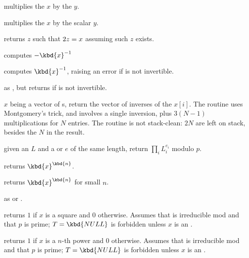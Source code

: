 
 multiplies the  $x$
by the  $y$.

 multiplies the  $x$
by the scalar $y$.

 returns $z$ such that $2\*z = x$
assuming such $z$ exists.



 computes $-\kbd{x}^{-1}$

 computes $\kbd{x}^{-1}$, raising an
error if  is not invertible.

 as , but returns
 if  is not invertible.


 $x$ being a vector of s,
return the vector of inverses of the $x[i]$. The routine uses Montgomery's
trick, and involves a single inversion, plus $3(N-1)$ multiplications for
$N$ entries. The routine is not stack-clean: $2N$  are left on
stack, besides the $N$ in the result.

 given an  $L$
and a  or  $e$ of the same length, return $\prod_i L_i^{e_i}$
modulo $p$.

 returns $\kbd{x}^\kbd{n}$.

 returns $\kbd{x}^\kbd{n}$
for small $n$.

 as
 or .

 returns $1$ if $x$ is a square
and $0$ otherwise. Assumes that  is irreducible mod  and that
$p$ is prime; $T = \kbd{NULL}$ is forbidden unless $x$ is an .

 returns $1$ if $x$
is a $n$-th power and $0$ otherwise. Assumes that  is irreducible mod
 and that $p$ is prime; $T = \kbd{NULL}$ is forbidden unless $x$ is an
.

